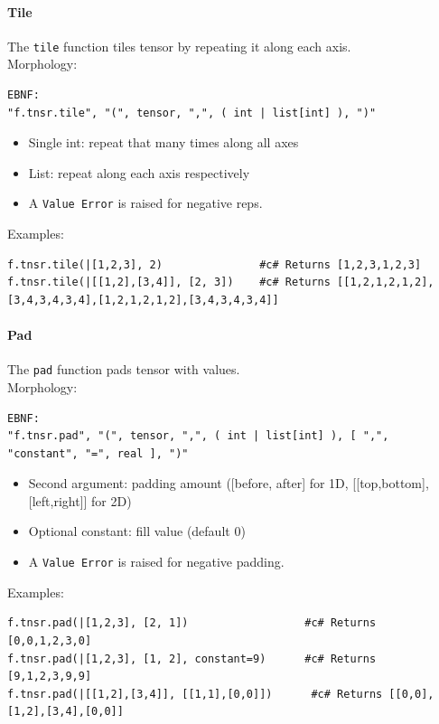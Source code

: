 \paragraph{Tile}
The \texttt{tile} function tiles tensor by repeating it along each axis.\\
Morphology:
\begin{verbatim}
EBNF:
"f.tnsr.tile", "(", tensor, ",", ( int | list[int] ), ")"
\end{verbatim}
\begin{itemize}
\item Single int: repeat that many times along all axes
\item List: repeat along each axis respectively
\item A \texttt{Value Error} is raised for negative reps.
\end{itemize}
Examples:
\begin{verbatim}
f.tnsr.tile(|[1,2,3], 2)               #c# Returns [1,2,3,1,2,3]
f.tnsr.tile(|[[1,2],[3,4]], [2, 3])    #c# Returns [[1,2,1,2,1,2],[3,4,3,4,3,4],[1,2,1,2,1,2],[3,4,3,4,3,4]]
\end{verbatim}

\paragraph{Pad}
The \texttt{pad} function pads tensor with values.\\
Morphology:
\begin{verbatim}
EBNF:
"f.tnsr.pad", "(", tensor, ",", ( int | list[int] ), [ ",", "constant", "=", real ], ")"
\end{verbatim}
\begin{itemize}
\item Second argument: padding amount ([before, after] for 1D, [[top,bottom],[left,right]] for 2D)
\item Optional constant: fill value (default 0)
\item A \texttt{Value Error} is raised for negative padding.
\end{itemize}
Examples:
\begin{verbatim}
f.tnsr.pad(|[1,2,3], [2, 1])                  #c# Returns [0,0,1,2,3,0]
f.tnsr.pad(|[1,2,3], [1, 2], constant=9)      #c# Returns [9,1,2,3,9,9]
f.tnsr.pad(|[[1,2],[3,4]], [[1,1],[0,0]])      #c# Returns [[0,0],[1,2],[3,4],[0,0]]
\end{verbatim}

